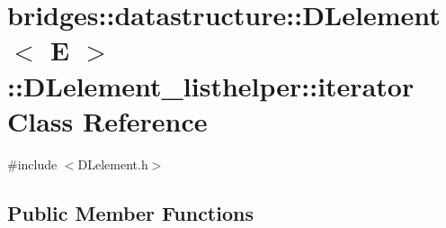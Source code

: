 \hypertarget{classbridges_1_1datastructure_1_1_d_lelement_1_1_d_lelement__listhelper_1_1iterator}{}\section{bridges\+:\+:datastructure\+:\+:D\+Lelement$<$ E $>$\+:\+:D\+Lelement\+\_\+listhelper\+:\+:iterator Class Reference}
\label{classbridges_1_1datastructure_1_1_d_lelement_1_1_d_lelement__listhelper_1_1iterator}


{\ttfamily \#include $<$D\+Lelement.\+h$>$}

\subsection*{Public Member Functions}
